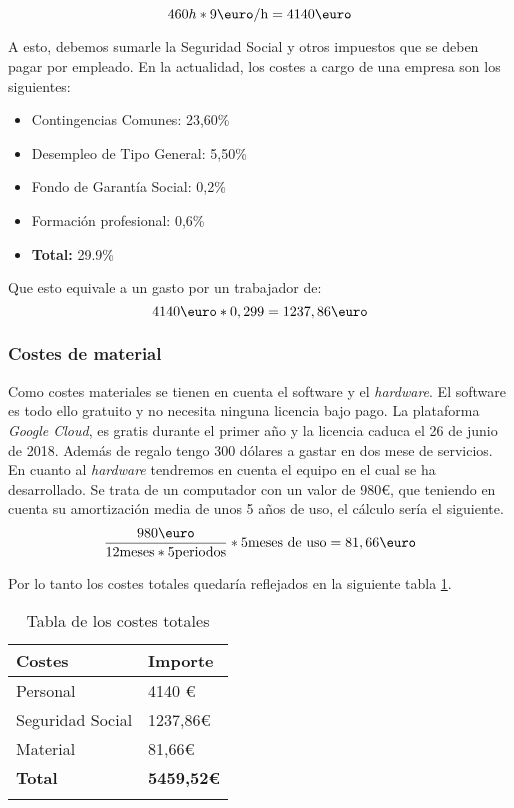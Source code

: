 \[ 460h * 9\textrm{\euro/h} = 4140\textrm{\euro}\]

A esto, debemos sumarle la Seguridad Social y otros impuestos que se deben pagar por empleado. En la actualidad, los costes a cargo de una empresa son los siguientes:

\begin{itemize}
\item Contingencias Comunes: 23,60\%
\item Desempleo de Tipo General: 5,50\%
\item Fondo de Garantía Social: 0,2\%
\item Formación profesional: 0,6\%
\item \textbf{Total:} 29.9\%
\end{itemize}

Que esto equivale a un gasto por un trabajador de: 
\[ 4140\textrm{\euro} * 0,299 = 1237,86\textrm{\euro}\]
\subsubsection{Costes de material}

Como costes materiales se tienen en cuenta el software y el \emph{hardware}. El software es todo ello gratuito y no necesita ninguna licencia bajo pago. La plataforma \emph{Google Cloud}, es gratis durante el primer año y la licencia caduca el 26 de junio de 2018. Además de regalo tengo 300 dólares a gastar en dos mese de servicios. En cuanto al \emph{hardware} tendremos en cuenta el equipo en el cual se ha desarrollado. Se trata de un computador con un valor de 980\euro, que teniendo en cuenta su amortización media de unos 5 años de uso, el cálculo sería el siguiente. 
\[ \frac{980\textrm{\euro}}{12\textrm{meses} * 5 \textrm{periodos}} *5\textrm{meses de uso} = 81,66\textrm{\euro}\]
 
Por lo tanto los costes totales quedaría reflejados en la siguiente tabla \ref{tab:costes}.

\begin{table}[]
\centering
{}
\begin{tabular}{p{4cm} p{2cm}}
\toprule
Costes & Importe \\ \midrule
Personal         & 4140 \euro{}   \\ 
Seguridad Social & 1237,86\euro{} \\ 
Material         & 81,66\euro{}   \\ 
\textbf{Total}   & \textbf{5459,52\euro{}} \\ \bottomrule
\caption{Tabla de los costes totales}
\label{tab:costes}

\end{tabular}
\end{table}

